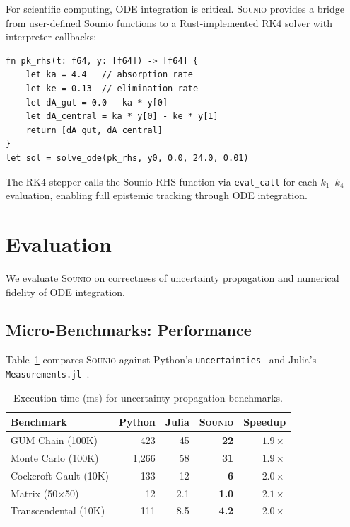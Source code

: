 \documentclass[acmsmall,screen,review,anonymous]{acmart}
\newcommand{\sounio}{\textsc{Sounio}\xspace}
\begin{document}
For scientific computing, ODE integration is critical.
\sounio provides a bridge from user-defined Sounio functions to
a Rust-implemented RK4 solver with interpreter callbacks:
\begin{lstlisting}[caption={ODE bridge: user-defined RHS evaluated 4 times per RK4 step}]
fn pk_rhs(t: f64, y: [f64]) -> [f64] {
    let ka = 4.4   // absorption rate
    let ke = 0.13  // elimination rate
    let dA_gut = 0.0 - ka * y[0]
    let dA_central = ka * y[0] - ke * y[1]
    return [dA_gut, dA_central]
}
let sol = solve_ode(pk_rhs, y0, 0.0, 24.0, 0.01)
\end{lstlisting}

The RK4 stepper calls the Sounio RHS function via
\texttt{eval\_call} for each $k_1$--$k_4$ evaluation,
enabling full epistemic tracking through ODE integration.

\section{Evaluation}
\label{sec:evaluation}

We evaluate \sounio on correctness of uncertainty propagation
and numerical fidelity of ODE integration.

\subsection{Micro-Benchmarks: Performance}

Table~\ref{tab:perf} compares \sounio against Python's
\texttt{uncertainties}~\cite{lebigot2024uncertainties} and Julia's
\texttt{Measurements.jl}~\cite{giordano2016measurements}.

\begin{table}[t]
\centering
\caption{Execution time (ms) for uncertainty propagation benchmarks.}
\label{tab:perf}
\begin{tabular}{lrrrr}
\toprule
Benchmark & Python & Julia & \sounio & Speedup \\
\midrule
GUM Chain (100K)       & 423   & 45   & \textbf{22}  & $1.9\times$ \\
Monte Carlo (100K)     & 1{,}266 & 58 & \textbf{31}  & $1.9\times$ \\
Cockcroft-Gault (10K)  & 133   & 12   & \textbf{6}   & $2.0\times$ \\
Matrix (50$\times$50)  & 12    & 2.1  & \textbf{1.0} & $2.1\times$ \\
Transcendental (10K)   & 111   & 8.5  & \textbf{4.2} & $2.0\times$ \\
\bottomrule
\end{tabular}
\end{table}
\end{document}
